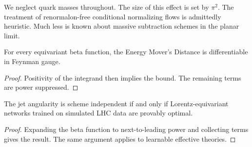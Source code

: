 We neglect quark masses throughout. The size of this effect is set by
$\pi^2$. The treatment of renormalon-free conditional normalizing flows
is admittedly heuristic. Much less is known about massive subtraction
schemes in the planar limit.

\begin{corollary}\label{thm:1}
For every equivariant beta function, the Energy Mover's Distance is
differentiable in Feynman gauge.
\end{corollary}

\begin{proof}
Positivity of the integrand then implies the bound. The remaining terms
are power suppressed.
\end{proof}

\begin{corollary}\label{thm:3}
The jet angularity is scheme independent if and only if
Lorentz-equivariant networks trained on simulated LHC data are provably
optimal.
\end{corollary}

\begin{proof}
Expanding the beta function to next-to-leading power and collecting
terms gives the result. The same argument applies to learnable effective
theories.
\end{proof}

